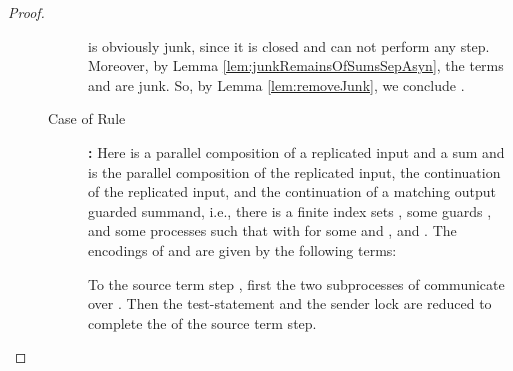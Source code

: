 \documentclass[]{llncs}
\begin{document}
\begin{proof}
\begin{description}
\begin{description}
					is obviously junk, since it is closed and can not perform any step.	Moreover, by Lemma \ref{lem:junkRemainsOfSumsSepAsyn}, the terms  and  are junk. So, by Lemma \ref{lem:removeJunk}, we conclude .
				\item[Case of Rule] \textbf{:} Here  is a parallel composition of a replicated input and a sum and  is the parallel composition of the replicated input, the continuation of the replicated input, and the continuation of a matching output guarded summand, i.e., there is a finite index sets , some guards , and some processes  such that  with  for some  and , and . The encodings of  and  are given by the following terms:
					
					To \simulate the source term step , first the two subprocesses of  communicate over . Then the test-statement and the sender lock are reduced to complete the \simulation of the source term step.
					

\end{description}
\end{description}
\end{proof}
\end{document}
